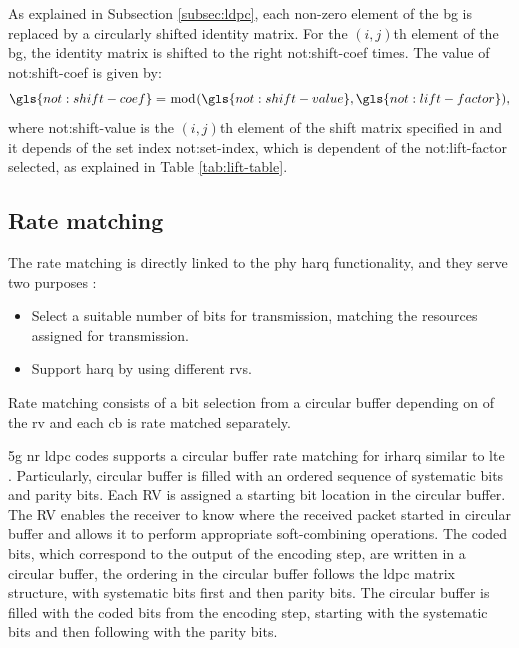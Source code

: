 As explained in Subsection \ref{subsec:ldpc}, each non-zero element of the \gls{bg} is replaced by a circularly shifted identity matrix.
%
For the $(i,j)$th element of the \gls{bg}, the identity matrix is shifted to the right \gls{not:shift-coef} times.
%
The value of \gls{not:shift-coef} is given by:
%
\begin{equation}
    \gls{not:shift-coef} = \bmod (\gls{not:shift-value}, \gls{not:lift-factor}) ,
\end{equation}
%
\noindent where \gls{not:shift-value} is the $(i,j)$th element of the shift matrix specified in \cite[Tables 5.3.2-2 and 5.3.2-3]{3gpp.38.212} and it depends of the set index \gls{not:set-index}, which is dependent of the \gls{not:lift-factor} selected, as explained in Table \ref{tab:lift-table}.



\subsection{Rate matching}

The rate matching is directly linked to the \gls{phy} \gls{harq} functionality, and they serve two purposes \cite{ErikDahlman5G}:
%
\begin{itemize}
    \item Select a suitable number of bits for transmission, matching the resources assigned for transmission.
    \item Support \gls{harq} by using different \glspl{rv}.
\end{itemize}
%
Rate matching consists of a bit selection from a circular buffer depending on of the \gls{rv} and each \gls{cb} is rate matched separately.

\Gls{5g} \gls{nr} \gls{ldpc} codes supports a circular buffer rate matching for \gls{irharq} similar to \gls{lte} \cite{Hamidi8417496}.
%
Particularly,  circular buffer is filled with an ordered sequence of systematic bits and parity bits. Each RV is assigned a starting bit location in  the  circular  buffer.  The  RV  enables  the  receiver  to  know  where the received packet started in circular buffer and allows it to perform appropriate soft-combining operations.
%
The coded bits, which correspond to the output of the encoding step, are written in a circular buffer, the ordering in the circular buffer follows the \gls{ldpc} matrix structure, with systematic bits first and then parity bits.
%
The circular buffer is filled with the coded bits from the encoding step, starting with the systematic bits and then following with the parity bits.



